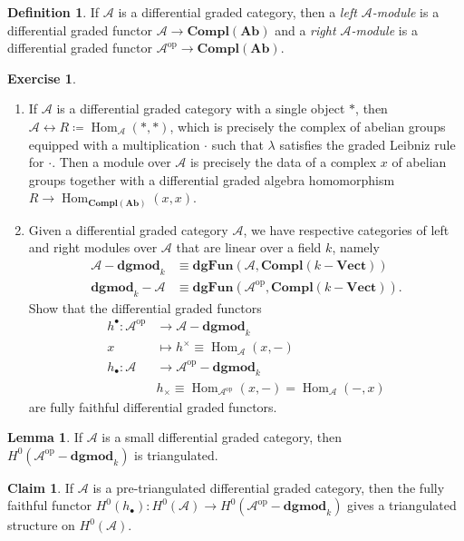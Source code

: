 \documentclass[10pt,letterpaper,cm]{nupset}
\theoremstyle{definition}
\newtheorem*{definition}{Definition}
\newtheorem{claim}{Claim}
\newtheorem{lemma}{Lemma}
\newtheorem{exercise}{Exercise}
\newcommand{\A}{\mathcal A}
\newcommand{\1}{\mathbf{1}}
\renewcommand{\a}{\mathscr{A}}
\newcommand{\0}{\vec 0}
\DeclareMathOperator{\op}{op}
\DeclareMathOperator{\Hom}{Hom}
\begin{document}
\begin{definition}
If $\a$ is a differential graded category, then a \textit{left $\a$-module} is a differential graded functor $\a \to \mathbf{Compl}(\mathbf{Ab})$ and a \textit{right $\a$-module} is a differential graded functor $\a^{\op} \to \mathbf{Compl}(\mathbf{Ab})$.
\end{definition}

\begin{exercise} $ $
\begin{enumerate}
\item If $ \a$ is a differential graded category with a single object $\ast$, then $\a \longleftrightarrow R \coloneqq \Hom_{\a}(\ast, \ast)$, which is precisely the complex of abelian groups equipped with a multiplication $\cdot$ such that $\lambda$ satisfies the graded Leibniz rule for $\cdot$.  Then a module over $\a$ is precisely the data of a complex $x$ of abelian groups together with a differential graded algebra homomorphism $R \to \Hom_{\mathbf{Compl}(\mathbf{Ab})}(x, x)$.
\item  Given a differential graded category $\a$, we have respective categories of left and right modules over $\a$  that are linear over a field $k$, namely 
\begin{align*}
  \a{-}\mathbf{dgmod}_k  & \equiv \mathbf{dgFun}(\A, \mathbf{Compl}(k{-}\mathbf{Vect}))
\\  \mathbf{dgmod}_k{-}\a & \equiv \mathbf{dgFun}(\A^{\op}, \mathbf{Compl}(k{-}\mathbf{Vect})).
\end{align*} Show that the differential graded functors
\begin{align*}
h^{\bullet} : \a^{\op} & \to  \a{-}\mathbf{dgmod}_k  
\\ x & \mapsto h^{\times} \equiv \Hom_{\a}(x, {-})
\\ h_{\bullet} : \a & \to \a^{\op}{-}\mathbf{dgmod}_k
\\ & h_{\times} \equiv \Hom_{\a^{\op}}(x, {-}) = \Hom_{\a}({-}, x)
\end{align*} are fully faithful differential graded functors.
\end{enumerate}
\end{exercise}

\begin{lemma}
If $ \a$ is a small differential graded category, then $H^0(\a^{\op}{-}\mathbf{dgmod}_k)$ is triangulated. 
\end{lemma}

\begin{claim}
If $ \a$ is a pre-triangulated differential graded category, then the fully faithful  functor $H^{0}(h_{\bullet}) : H^0(\a) \to H^0(\a^{\op}{-}\mathbf{dgmod}_k)$ gives a triangulated structure on $H^0(\a)$. 
\end{claim}
\end{document}
